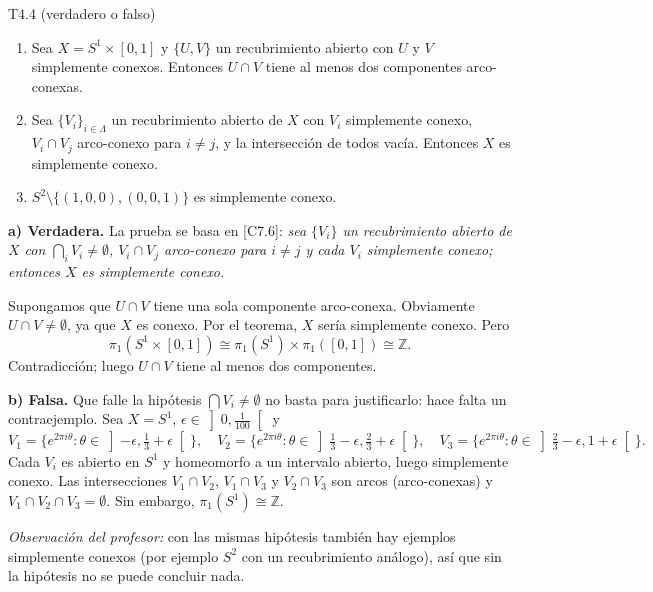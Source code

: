 \begin{ejercicio}{T4.4 (verdadero o falso)}
\begin{enumerate}
    \item[a)] Sea $X = S^1 \times [0,1]$ y $\{U,V\}$ un recubrimiento abierto con $U$ y $V$ simplemente conexos. Entonces $U \cap V$ tiene al menos dos componentes arco-conexas.
    \item[b)] Sea $\{V_i\}_{i \in \Lambda}$ un recubrimiento abierto de $X$ con $V_i$ simplemente conexo, $V_i \cap V_j$ arco-conexo para $i \neq j$, y la intersección de todos vacía. Entonces $X$ es simplemente conexo.
    \item[c)] $S^2 \setminus \{(1,0,0),(0,0,1)\}$ es simplemente conexo.
\end{enumerate}

\sol {} \quad {}

\textbf{a) Verdadera.} La prueba se basa en [C7.6]: \emph{sea $\{V_i\}$ un recubrimiento abierto de $X$ con $\bigcap_i V_i \neq \emptyset$, $V_i \cap V_j$ arco-conexo para $i \neq j$ y cada $V_i$ simplemente conexo; entonces $X$ es simplemente conexo.}

Supongamos que $U \cap V$ tiene una sola componente arco-conexa. Obviamente $U \cap V \neq \emptyset$, ya que $X$ es conexo. Por el teorema, $X$ sería simplemente conexo. Pero
\[ \pi_1(S^1 \times [0,1]) \cong \pi_1(S^1) \times \pi_1([0,1]) \cong \mathbb{Z}. \]
Contradicción; luego $U \cap V$ tiene al menos dos componentes.

\textbf{b) Falsa.} Que falle la hipótesis $\bigcap V_i \neq \emptyset$ no basta para justificarlo: hace falta un contraejemplo. Sea $X = S^1$, $\epsilon \in \left]0,\frac{1}{100}\right[$ y
\[ V_1 = \{e^{2\pi i\theta} : \theta \in \left]-\epsilon,\tfrac13+\epsilon\right[\},\quad V_2 = \{e^{2\pi i\theta} : \theta \in \left]\tfrac13-\epsilon,\tfrac23+\epsilon\right[\},\quad V_3 = \{e^{2\pi i\theta} : \theta \in \left]\tfrac23-\epsilon,1+\epsilon\right[\}. \]
Cada $V_i$ es abierto en $S^1$ y homeomorfo a un intervalo abierto, luego simplemente conexo. Las intersecciones $V_1 \cap V_2$, $V_1 \cap V_3$ y $V_2 \cap V_3$ son arcos (arco-conexas) y $V_1 \cap V_2 \cap V_3 = \emptyset$. Sin embargo, $\pi_1(S^1) \cong \mathbb{Z}$.

\emph{Observación del profesor:} con las mismas hipótesis también hay ejemplos simplemente conexos (por ejemplo $S^2$ con un recubrimiento análogo), así que sin la hipótesis no se puede concluir nada.


\end{ejercicio}

